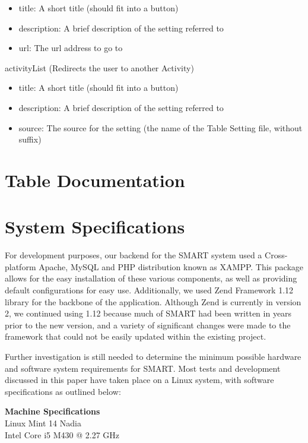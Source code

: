 \documentclass[12pt]{article}
\begin{document}
\begin{appendices}
\begin{framed}
\begin{spacing}{1.0}
\begin{itemize}
    \item title: A short title (should fit into a button)
    \item description: A brief description of the setting referred to
    \item url: The url address to go to
\end{itemize}
activityList (Redirects the user to another Activity)
\begin{itemize}
    \item title: A short title (should fit into a button)
    \item description: A brief description of the setting referred to
    \item source: The source for the setting (the name of the Table Setting file, without suffix)
\end{itemize}
\end{spacing}
\end{framed}

\clearpage
\section{Table Documentation}

\clearpage
\section{System Specifications}

For development purposes, our backend for the SMART system used a Cross-platform Apache, MySQL and PHP distribution known as XAMPP. This package allows for the easy installation of these various components, as well as providing default configurations for easy use. Additionally, we used Zend Framework 1.12 library for the backbone of the application. Although Zend is currently in version 2, we continued using 1.12 because much of SMART had been written in years prior to the new version, and a variety of significant changes were made to the framework that could not be easily updated within the existing project.

Further investigation is still needed to determine the minimum possible hardware and software system requirements for SMART. Most tests and development discussed in this paper have taken place on a Linux system, with software specifications as outlined below:
\\

\begin{spacing}{1.0}
\noindent\textbf{Machine Specifications} \\
Linux Mint 14 Nadia \\
Intel Core i5 M430 @ 2.27 GHz \\


\end{spacing}
\end{appendices}
\end{document}
